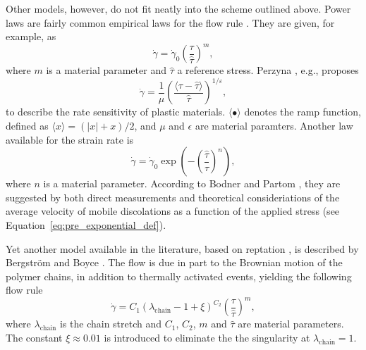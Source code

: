 Other models, however, do not fit neatly into the scheme outlined above.
Power laws are fairly common empirical laws for the flow rule \citep{brownPowerlawCreepEquation1980}.
They are given, for example, as \citep{bergstromMechanicsSolidPolymers2015}
\begin{equation}
	\label{eq:flow_rule_power_law}
	\dot \gamma = \dot \gamma_0 \left(\frac{\tau}{\hat \tau}\right)^m,
\end{equation}
where $m$ is a material parameter and $\hat \tau$ a reference stress.
Perzyna \citep{perzynaConstitutiveEquationsRate1963}, e.g., proposes
\begin{equation}
\label{eq:flow_rule_perzyna}
  \dot \gamma = \frac{1}{\mu}\left(\frac{\langle\tau - \hat\tau\rangle}{\hat\tau}\right)^{1/\varepsilon},
\end{equation}
to describe the rate sensitivity of plastic materials.
$\langle\bullet\rangle$ denotes the ramp function, defined as $\langle x\rangle = (|x| + x) /2$, and $\mu$ and $\epsilon$ are material paramters.
Another law available for the strain rate is \citep{kellyInfluenceLimitingDislocation1974, bodnerLargeDeformationElasticViscoplastic1972}
\begin{equation}
  \label{eq:exp_flow_law}
	\dot \gamma = \dot \gamma_0 \exp\left(-\left(\frac{\hat \tau}{\tau}\right)^n\right),
\end{equation}
where $n$ is a material parameter.
According to Bodner and Partom \citep{bodnerLargeDeformationElasticViscoplastic1972}, they are suggested by both direct measurements and theoretical consideriations of the average velocity of mobile discolations as a function of the applied stress (see Equation~\eqref{eq:pre_exponential_def}).

Yet another model available in the literature, based on reptation \citep{doiDynamicsConcentratedPolymer1978a}, is described by Bergström and Boyce \citep{bergstromConstitutiveModelingLarge1998, bergstromConstitutiveModelingTimedependent2001}.
The flow is due in part to the Brownian motion of the polymer chains, in addition to thermally activated events, yielding the following flow rule
\begin{equation}
	\label{eq:bb_reptation_model}
	\dot \gamma = C_1(\lambda_\text{chain} -1 + \xi)^{C_2}\left(\frac{\tau}{\hat\tau}\right)^{m},
\end{equation}
where $\lambda_\text{chain}$ is the chain stretch and $C_1$, $C_2$, $m$ and $\hat \tau$ are material parameters.
The constant $\xi\approx 0.01$ is introduced to eliminate the the singularity at $\lambda_\text{chain}=1$.


